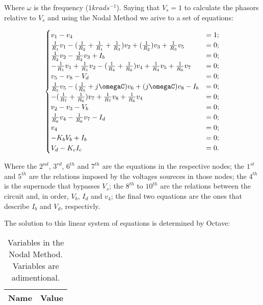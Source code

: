 Where $\omega$ is the frequency ($1k rads^{-1}$).
Saying that $V_s = 1$ to calculate the phasors relative to $V_s$ and using the Nodal Method we arive to a set of equations:

\begin{equation}
\begin{cases}
	v_1 - v_4 &= 1;																				  	  \\
	\frac{1}{R_1}v_1 - (\frac{1}{R_2}+\frac{1}{R_1}+\frac{1}{R_3})v_2 + (\frac{1}{R_2})v_3 + \frac{1}{R_3}v_5 &= 0; \\
  	\frac{1}{R_2}v_2 - \frac{1}{R_2}v_3+ I_b &= 0;													  \\
  	-\frac{1}{R_1}v_1 + \frac{1}{R_1}v_2 - (\frac{1}{R_4}+\frac{1}{R_6})v_4 + \frac{1}{R_4}v_5 + \frac{1}{R_6}v_7 &= 0;			  																	  \\
	v_5 - v_8 - V_d &= 0;																			  \\
  	\frac{1}{R_5}v_5 - (\frac{1}{R_5} + j\omegaC)v_6 + (j\omegaC)v_8- I_b &= 0;						  \\
  	-(\frac{1}{R_7}+\frac{1}{R_6})v_7 + \frac{1}{R_7}v_8 + \frac{1}{R_6}v_4 &= 0;					  \\
	v_2 - v_3 - V_b &= 0;																			  \\
  	\frac{1}{R_6}v_4 - \frac{1}{R_6}v_7 - I_d &= 0;													  \\
  	v_4 &= 0;																						  \\
  	-K_bV_b + I_b &= 0;																				  \\
  	V_d - K_cI_c &= 0.
\end{cases}
\label{eq:PASSO4}
\end{equation}

Where the $2^{nd}$, $3^{rd}$, $6^{th}$ and $7^{th}$ are the equations in the respective nodes; the $1^{st}$ and $5^{th}$ are the relations imposed by the voltages soureces in those nodes; the $4^{th}$ is the supernode that bypasses $V_s$; the $8^{th}$ to $10^{th}$ are the relations between the circuit and, in order, $V_b$, $I_d$ and $v_4$; the final two equations are the ones that describe $I_b$ and $V_d$, respectivly. 

The solution to this linear system of equations is determined by Octave:

\begin{table}[h]
  \centering
  \begin{tabular}{|l|r|}
    \hline    
    {\bf Name} & {\bf Value} \\ \hline
    
  \end{tabular}
  \caption{Variables in the Nodal Method. Variables are adimentional.}
  \label{tab:PASSO4}
\end{table}

